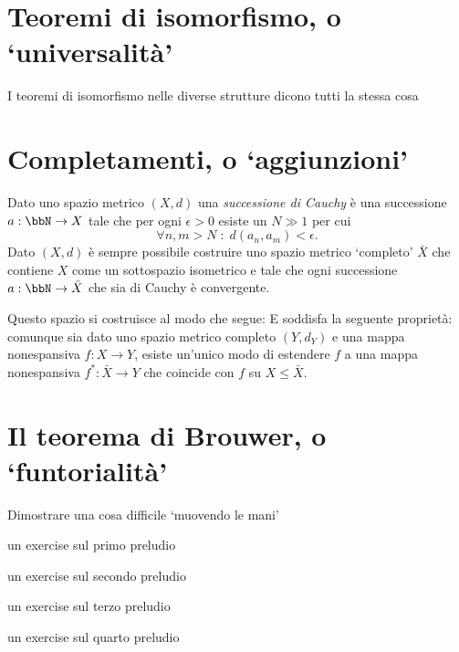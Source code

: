 \section*{Teoremi di isomorfismo, o `universalità'}
I teoremi di isomorfismo nelle diverse strutture dicono tutti la stessa cosa
\section*{Completamenti, o `aggiunzioni'}
Dato uno spazio metrico $(X,d)$ una \emph{successione di Cauchy} è una successione $a : \bbN \to X$ tale che per ogni $\epsilon>0$ esiste un $N\gg 1$ per cui
\[\forall n,m> N\; : \; d(a_n,a_m) < \epsilon.\]
Dato $(X,d)$ è sempre possibile costruire uno spazio metrico `completo' $\bar X$ che contiene $X$ come un sottospazio isometrico e tale che ogni successione $a : \bbN \to \bar X$ che sia di Cauchy è convergente.

Questo spazio si costruisce al modo che segue:
\Todo{}
E soddisfa la seguente proprietà: comunque sia dato uno spazio metrico completo $(Y,d_Y)$ e una mappa nonespansiva $f : X\to Y$, esiste un'unico modo di estendere $f$ a una mappa nonespansiva $f^* : \bar X \to Y$ che coincide con $f$ su $X\le \bar X$.
\section*{Il teorema di Brouwer, o `funtorialità'}
Dimostrare una cosa difficile `muovendo le mani'
\begin{exercises}
\item \label{ex_prelude_1} un exercise sul primo preludio
\item \label{ex_prelude_2} un exercise sul secondo preludio
\item \label{ex_prelude_3} un exercise sul terzo preludio
\item \label{ex_prelude_4} un exercise sul quarto preludio
\end{exercises}
